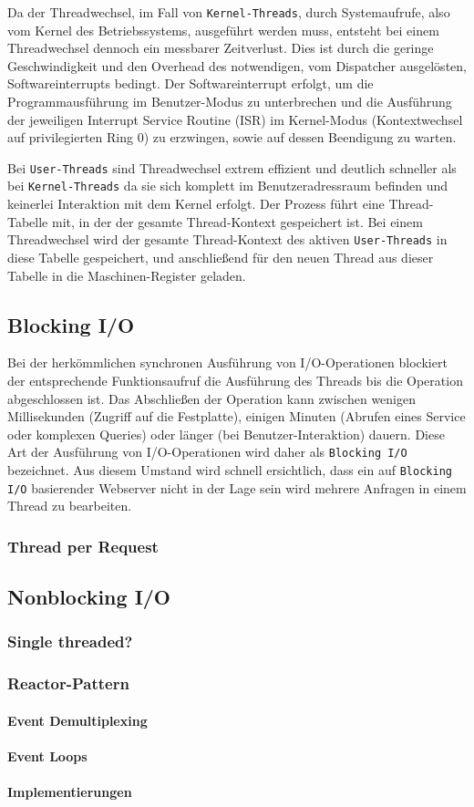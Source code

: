 \noindent
Da der Threadwechsel, im Fall von \verb|Kernel-Threads|, durch Systemaufrufe, also vom Kernel des Betriebssystems, ausgeführt werden muss, entsteht
bei einem Threadwechsel dennoch ein messbarer Zeitverlust.
Dies ist durch die geringe Geschwindigkeit und den Overhead des notwendigen, vom Dispatcher ausgelösten, Softwareinterrupts bedingt.
Der Softwareinterrupt erfolgt, um die Programmausführung im Benutzer-Modus zu unterbrechen und die Ausführung der jeweiligen Interrupt Service Routine (ISR) im
Kernel-Modus (Kontextwechsel auf privilegierten Ring 0) zu erzwingen, sowie auf dessen Beendigung zu warten.

Bei \verb|User-Threads| sind Threadwechsel extrem effizient und deutlich schneller als bei \verb|Kernel-Threads|
da sie sich komplett im Benutzeradressraum befinden und keinerlei Interaktion mit dem Kernel erfolgt.
Der Prozess führt eine Thread-Tabelle mit, in der der gesamte Thread-Kontext gespeichert ist.
Bei einem Threadwechsel wird der gesamte Thread-Kontext des aktiven \verb|User-Threads| in diese Tabelle gespeichert, und anschließend für den neuen Thread
aus dieser Tabelle in die Maschinen-Register geladen.
\parencite[Kapitel 2.2.6 Thread Scheduling]{Tanenbaum2016}

\subsection{Blocking I/O}
\label{subsec:blocking-i/o}
Bei der herkömmlichen synchronen Ausführung von I/O-Operationen blockiert der entsprechende Funktionsaufruf die Ausführung des
Threads bis die Operation abgeschlossen ist. Das Abschließen der Operation kann zwischen wenigen Millisekunden (Zugriff auf die Festplatte),
einigen Minuten (Abrufen eines Service oder komplexen Queries) oder länger (bei Benutzer-Interaktion) dauern.
Diese Art der Ausführung von I/O-Operationen wird daher als \verb|Blocking I/O| bezeichnet.
Aus diesem Umstand wird schnell ersichtlich, dass ein auf \verb|Blocking I/O| basierender Webserver nicht in der Lage sein wird mehrere Anfragen in einem
Thread zu bearbeiten.
\subsubsection{Thread per Request}
\label{subsubsec:thread per request}

\subsection{Nonblocking I/O}
\label{subsec:nonblocking-i/o}
\subsubsection{Single threaded?}
\subsubsection{Reactor-Pattern}
\paragraph{Event Demultiplexing}
\paragraph{Event Loops}
\paragraph{Implementierungen}
